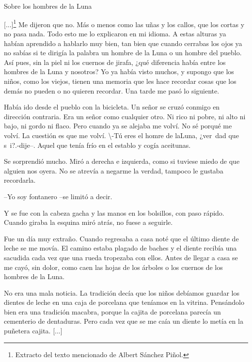 \documentclass[a3paper]{tufte-handout}
\begin{document}
\section*{}{Sobre los hombres de la Luna}

[...]\footnote{Extracto del texto mencionado de Albert Sánchez Piñol.} 
Me dijeron que no. Más o menos como las uñas y los callos, que los cortas y no pasa nada. Todo esto me lo explicaron en mi idioma. A estas alturas ya habían aprendido a hablarlo muy bien, tan bien que cuando cerrabas los ojos ya no sabías si te dirigía la palabra un hombre de la Luna o un hombre del pueblo. Así pues, sin la piel ni los cuernos de jirafa, ¿qué diferencia había entre los hombres de la Luna y nosotros? Yo ya había visto muchos, y supongo que los niños, como los viejos, tienen una memoria que les hace recordar cosas que los demás no pueden o no quieren recordar. Una tarde me pasó lo siguiente.

Había ido desde el pueblo con la bicicleta. Un señor se cruzó conmigo en dirección contraria. Era un señor como cualquier otro. Ni rico ni pobre, ni alto ni bajo, ni gordo ni flaco. Pero cuando ya se alejaba me volví. No sé porqué me volví. La cuestión es que me volví.
{
\color {brown}
\textbackslash -Tú eres el hom\hspace{2\baselineskip}re d\qquad e la\quad Luna, ¿ver\, dad que s\ i?.}-dije--. Aquel que tenía frío en el establo y cogía aceitunas.

Se sorprendió mucho. Miró a derecha e izquierda, como si tuviese miedo de que alguien nos oyera. No se atrevía a negarme la verdad, tampoco le gustaba recordarla.

--Yo soy fontanero --se limitó a decir.

Y se fue con la cabeza gacha y las manos en los bolsillos, con paso rápido. Cuando giraba la esquina miró atrás, no fuese a seguirle.

Fue un día muy extraño. Cuando regresaba a casa noté que el último diente de leche se me movía. El camino estaba plagado de baches y el diente recibía una sacudida cada vez que una rueda tropezaba con ellos. Antes de llegar a casa se me cayó, sin dolor, como caen las hojas de los árboles o los cuernos de los hombres de la Luna.

No era una mala noticia. La tradición decía que los niños debíamos guardar los dientes de leche en una caja de porcelana que teníamos en la vitrina. Pensándolo bien era una tradición macabra, porque la cajita de porcelana parecía un cementerio de dentaduras. Pero cada vez que se me caía un diente lo metía en la puñetera cajita. [...]
\end{document}
